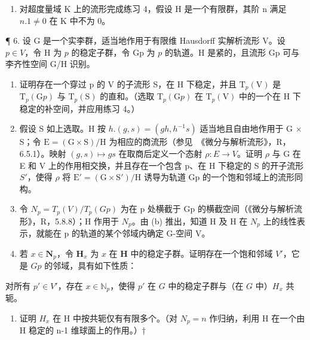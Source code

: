 \begin{enumerate}
\def\labelenumi{\arabic{enumi}.}
\setcounter{enumi}{4}
\tightlist
\item
  对超度量域 K 上的流形完成练习 4，假设 H 是一个有限群，其阶 n 满足 \(n.1 \neq 0\) 在 K 中不为 0。
\end{enumerate}

¶ 6. 设 G 是一个实李群，适当地作用于有限维 Hausdorff 实解析流形 V。设 \(p \in V\)，令 H 为 \(p\) 的稳定子群，令 Gp 为 \(p\) 的轨道。H 是紧的，且流形 Gp 可与李齐性空间 G/H 识别。

\begin{enumerate}
\def\labelenumi{(\alph{enumi})}
\item
  证明存在一个穿过 p 的 V 的子流形 S，在 H 下稳定，并且 \(\mathrm{T}_{p}(\mathrm{V})\) 是 \(\mathrm{T}_{p}(\mathrm{G}p)\) 与 \(\mathrm{T}_{p}(\mathrm{S})\) 的直和。（选取 \(\mathrm{T}_{p}(\mathrm{G}p)\) 在 \(\mathrm{T}_{p}(\mathrm{V})\) 中的一个在 H 下稳定的补空间，并应用练习 4。）
\item
  假设 S 如上选取。H 按 \(h.(g,s)=(gh,h^{-1}s)\) 适当地且自由地作用于 G × S；令 \(\mathrm{E}=(\mathrm{G}\times\mathrm{S})/\mathrm{H}\) 为相应的商流形（参见~《微分与解析流形》，R，6.5.1）。映射 \((g,s)\mapsto gs\) 在取商后定义一个态射 \(\rho:E\to V\)。证明 \(\rho\) 与 G 在 E 和 V 上的作用相交换，并且存在一个包含 p、在 H 下稳定的 S 的开子流形 \(S'\)，使得 \(\rho\) 将 \(\mathrm{E}'=(\mathrm{G}\times\mathrm{S}')/\mathrm{H}\) 诱导为轨道 Gp 的一个饱和邻域上的流形同构。
\item
  令 \(N_{p} = T_{p}(V)/T_{p}(Gp)\) 为在 p 处横截于 Gp 的横截空间（《微分与解析流形》，R，5.8.8）；H 作用于 \(N_{p}\)。由 (b) 推出，知道 H 及 H 在 \(N_{p}\) 上的线性表示，就能在 p 的轨道的某个邻域内确定 G-空间 V。
\item
  若 \(x \in \mathbf{N}_p\)，令 \(\mathbf{H}_x\) 为 \(x\) 在 \(\mathbf{H}\) 中的稳定子群。证明存在一个饱和邻域 \(V'\)，它是 \(Gp\) 的邻域，具有如下性质：
\end{enumerate}

对所有 \(p' \in V'\)，存在 \(x \in \mathbb{N}_p\)，使得 \(p'\) 在 \(G\) 中的稳定子群与（在 \(G\) 中）\(H_x\) 共轭。

\begin{enumerate}
\def\labelenumi{(\alph{enumi})}
\setcounter{enumi}{4}
\tightlist
\item
  证明 \(H_{x}\) 在 H 中按共轭仅有有限多个。（对 \(N_{p}=n\) 作归纳，利用 H 在一个由 H 稳定的 n-1 维球面上的作用。）†
\end{enumerate}

